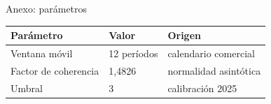 \documentclass[11pt,aspectratio=169,xcolor=table]{beamer}
\begin{document}

\appendix

\begin{frame}{Anexo: parámetros}
  \begin{table}
    \centering\small
    \begin{tabular}{@{}lll@{}}
      \toprule
      Parámetro & Valor & Origen \\
      \midrule
      Ventana móvil        & 12 períodos & calendario comercial \\
      Factor de coherencia & 1,4826      & normalidad asintótica \\
      Umbral               & 3           & calibración 2025 \\
      \bottomrule
    \end{tabular}
  \end{table}
\end{frame}
\end{document}
